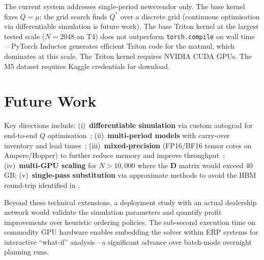 The current system addresses single-period newsvendor only. The base kernel fixes $Q = \mu$; the grid search finds $Q^*$ over a discrete grid (continuous optimisation via differentiable simulation is future work). The base Triton kernel at the largest tested scale ($N{=}2048$ on T4) does not outperform \texttt{torch.compile} on wall time---PyTorch Inductor generates efficient Triton code for the matmul, which dominates at this scale. The Triton kernel requires NVIDIA CUDA GPUs. The M5 dataset requires Kaggle credentials for download.

\section{Future Work}

Key directions include: (i)~\textbf{differentiable simulation} via custom autograd for end-to-end $Q$ optimisation~\citep{paszke2019}; (ii)~\textbf{multi-period models} with carry-over inventory and lead times~\citep{zipkin2000}; (iii)~\textbf{mixed-precision} (FP16/BF16 tensor cores on Ampere/Hopper) to further reduce memory and improve throughput~\citep{micikevicius2018}; (iv)~\textbf{multi-GPU scaling} for $N > 10{,}000$ where the $\mathbf{D}$ matrix would exceed 40\,GB; (v)~\textbf{single-pass substitution} via approximate methods to avoid the HBM round-trip identified in .

Beyond these technical extensions, a deployment study with an actual dealership network would validate the simulation parameters and quantify profit improvements over heuristic ordering policies. The sub-second execution time on commodity GPU hardware enables embedding the solver within ERP systems for interactive ``what-if'' analysis---a significant advance over batch-mode overnight planning runs.
